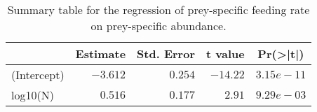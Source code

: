 \begin{table}[!htbp]
\caption{Summary table for the regression of prey-specific feeding rate 
  on prey-specific abundance.\label{tab:FN}} 
\begin{center}
\begin{tabular}{lrrrr}
\hline
\multicolumn{1}{l}{}&\multicolumn{1}{c}{Estimate}&\multicolumn{1}{c}{Std. Error}&\multicolumn{1}{c}{t value}&\multicolumn{1}{c}{Pr(\textgreater |t|)}\tabularnewline
\hline
(Intercept)&$-3.612$&$0.254$&$-14.22$&$3.15e-11$\tabularnewline
log10(N)&$ 0.516$&$0.177$&$  2.91$&$9.29e-03$\tabularnewline
\hline
\end{tabular}\end{center}
\end{table}
